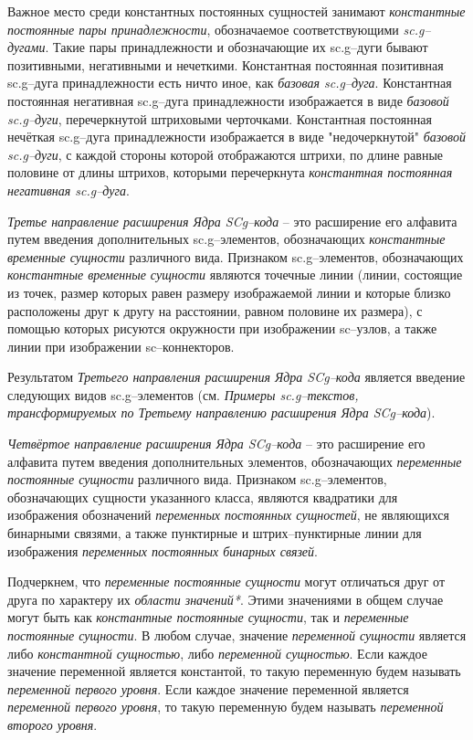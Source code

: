 Важное место среди константных постоянных сущностей занимают \textit{константные постоянные пары принадлежности}, обозначаемое соответствующими \textit{sc.g--дугами}. Такие пары принадлежности и обозначающие их sc.g--дуги бывают позитивными, негативными и нечеткими. Константная постоянная позитивная sc.g--дуга принадлежности есть ничто иное, как \textit{базовая sc.g--дуга}. Константная постоянная негативная sc.g--дуга принадлежности изображается в виде \textit{базовой sc.g--дуги}, перечеркнутой штриховыми черточками. Константная постоянная нечёткая sc.g--дуга принадлежности изображается в виде "недочеркнутой"{} \textit{базовой sc.g--дуги}, с каждой стороны которой отображаются штрихи, по длине равные половине от длины штрихов, которыми перечеркнута \textit{константная постоянная негативная sc.g--дуга}.




\textit{Третье направление расширения Ядра SCg--кода} -- это расширение его алфавита путем введения дополнительных sc.g--элементов, обозначающих \textit{константные временные сущности} различного вида. Признаком sc.g--элементов, обозначающих \textit{константные временные сущности} являются точечные линии (линии, состоящие из точек, размер которых равен размеру изображаемой линии и которые близко расположены друг к другу на расстоянии, равном половине их размера), с помощью которых рисуются окружности при изображении sc--узлов, а также линии при изображении sc--коннекторов.

Результатом \textit{Третьего направления расширения Ядра SCg--кода} является введение следующих видов sc.g--элементов (см. \textit{Примеры sc.g--текстов, трансформируемых по Третьему направлению расширения Ядра SCg--кода}).



	
\textit{Четвёртое направление расширения Ядра SCg--кода} -- это расширение его алфавита путем введения дополнительных элементов, обозначающих \textit{переменные постоянные сущности} различного вида. Признаком sc.g--элементов, обозначающих сущности указанного класса, являются квадратики для изображения обозначений \textit{переменных постоянных сущностей}, не являющихся бинарными связями, а также пунктирные и штрих--пунктирные линии для изображения \textit{переменных постоянных бинарных связей}. 

Подчеркнем, что \textit{переменные постоянные сущности} могут отличаться друг от друга по характеру их \textit{области значений*}. Этими значениями в общем случае могут быть как \textit{константные постоянные сущности}, так и \textit{переменные постоянные сущности}. В любом случае, значение \textit{переменной сущности} является либо \textit{константной сущностью}, либо \textit{переменной сущностью}. Если каждое значение переменной является константой, то такую переменную будем называть \textit{переменной первого уровня}. Если каждое значение переменной является \textit{переменной первого уровня}, то такую переменную будем называть \textit{переменной второго уровня}. 

